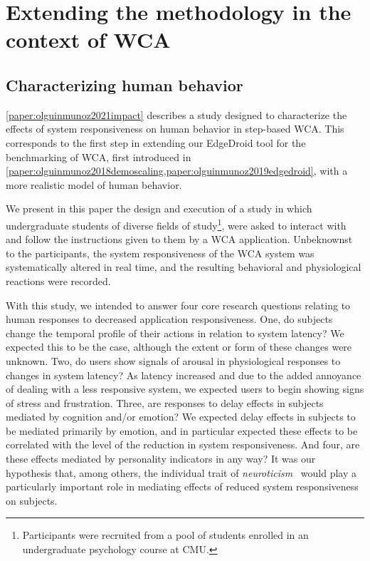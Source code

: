 \section{Extending the methodology in the context of \acs{WCA}}


\subsection{Characterizing human behavior}

\cref{paper:olguinmunoz2021impact} describes a study designed to characterize the effects of system responsiveness on human behavior in step-based \ac{WCA}.
This corresponds to the first step in extending our EdgeDroid tool for the benchmarking of \ac{WCA}, first introduced in \cref{paper:olguinmunoz2018demoscaling,paper:olguinmunoz2019edgedroid}, with a more realistic model of human behavior.

We present in this paper the design and execution of a study in which undergraduate students of diverse fields of
study\footnote{%
    Participants were recruited from a pool of students enrolled in an undergraduate psychology course at \ac{CMU}.
}, were asked to interact with and follow the instructions given to them by a \ac{WCA} application.
Unbeknownst to the participants, the system responsiveness of the \ac{WCA} system was systematically altered in real time, and the resulting behavioral and physiological reactions were recorded.

With this study, we intended to answer four core research questions relating to human responses to decreased application responsiveness.
One, do subjects change the temporal profile of their actions in relation to system latency?
We expected this to be the case, although the extent or form of these changes were unknown.
Two, do users show signals of arousal in physiological responses to changes in system latency?
As latency increased and due to the added annoyance of dealing with a less responsive system, we expected users to begin showing signs of stress and frustration.
Three, are responses to delay effects in subjects mediated by cognition and/or emotion?
We expected delay effects in subjects to be mediated primarily by emotion, and in particular expected these effects to be correlated with the level of the reduction in system responsiveness.
And four, are these effects mediated by personality indicators in any way?
It was our hypothesis that, among others, the individual trait of \emph{neuroticism}~\cite{john1999big} would play a particularly important role in mediating effects of reduced system responsiveness on subjects.

